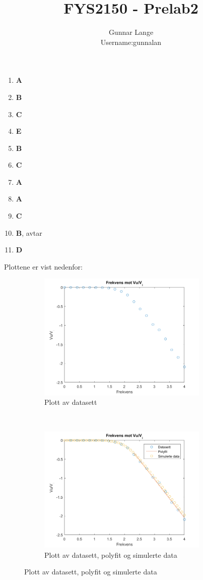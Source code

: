 \documentclass[a4paper, 10pt]{article}
\date{}
\title{FYS2150 - Prelab2}
\author{Gunnar Lange\\ Username:gunnalan}
\begin{document}
\maketitle
\begin{enumerate}
\item \textbf{A}
\item \textbf{B}
\item \textbf{C}
\item \textbf{E}
\item \textbf{B}
\item \textbf{C}
\item \textbf{A}
\item \textbf{A}
\item \textbf{C}
\item \textbf{B}, avtar
\item \textbf{D}
\end{enumerate}

Plottene er vist nedenfor:
\begin{figure}[!ht]
    \centering
    \begin{subfigure}[H!]{0.5\textwidth}
        \centering
        \includegraphics[height=2.4in]{FmotVu.png}
        \caption{Plott av datasett}
            \end{subfigure}%
    ~ 
    \begin{subfigure}[H!]{0.5\textwidth}
        \centering
        \includegraphics[height=2.4in]{FmotVu_og_simulert.png}
        \caption{Plott av datasett, polyfit og simulerte data}
    \end{subfigure}
\end{figure}
\end{document}
